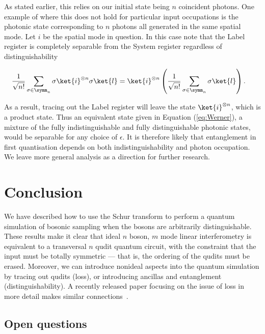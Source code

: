 As stated earlier, this relies on our initial state being $n$ coincident photons. One example of where this does not hold for particular input occupations is the photonic state corresponding to $n$ photons all generated in the same spatial mode. Let $i$ be the spatial mode in question. In this case note that the Label register is completely separable from the System register regardless of distinguishability

\begin{align}
\frac{1}{\sqrt{n!}}\sum_{\sigma\in\symm_n}\sigma\ket{i}^{\otimes n}\sigma\ket{l} &= \ket{i}^{\otimes n}\left(\frac{1}{\sqrt{n!}}\sum_{\sigma\in\symm_n}\sigma\ket{l}\right).
\end{align}

As a result, tracing out the Label register will leave the state $\ket{i}^{\otimes n}$, which is a product state. Thus an equivalent state given in Equation (\ref{eq:Werner}), a mixture of the fully indistinguishable and fully distinguishable photonic states, would be separable for any choice of $\epsilon$. It is therefore likely that entanglement in first quantisation depends on both indistinguishability and photon occupation. We leave more general analysis as a direction for further research.

\section{Conclusion}
\label{sec:nc-conclusion}

We have described how to use the Schur transform to perform a quantum simulation of bosonic sampling when the bosons are arbitrarily distinguishable.
These results make it clear that ideal $n$ boson, $m$ mode linear interferometry is equivalent to a transversal $n$ qudit quantum circuit, with the constraint that the input must be totally symmetric --- that is, the ordering of the qudits must be erased.
Moreover, we can introduce nonideal aspects into the quantum simulation by tracing out qudits (loss), or introducing ancillas and entanglement (distinguishability).
A recently released paper focusing on the issue of loss in more detail makes similar connections~\cite{oszmaniec2018}.

\subsection{Open questions}

